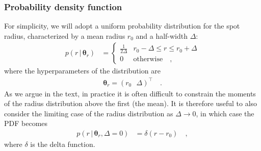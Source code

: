 \documentclass[modern]{aastex62}
\begin{document}
\subsubsection{Probability density function}
%
For simplicity, we will adopt a uniform probability distribution for the
spot radius, characterized by a mean radius $r_0$ and a half-width $\Delta$:
%
\begin{align}
    p(r \, \big| \, \pmb{\theta}_{r})
     & =
    \begin{cases}
        \frac{1}{2\Delta} & r_0 - \Delta \leq r \leq r_0 + \Delta
        \\
        0                 & \mathrm{otherwise}
        \quad,
    \end{cases}
\end{align}
%
where the hyperparameters of the distribution are
%
\begin{align}
    \pmb{\theta}_r = \left(
    r_0 \, \, \, \,
    \Delta \right)^\top
    \quad.
\end{align}
%
As we argue in the text, in practice it is often difficult to constrain the
moments of the radius distribution above the first (the mean). It is
therefore useful to also consider the limiting case of the radius distribution
as $\Delta \rightarrow 0$, in which case the PDF becomes
%
\begin{align}
    p(r \, \big| \, \pmb{\theta}_{r}, \Delta = 0)
     & =
    \delta(r - r_0)
    \quad,
\end{align}
%
where $\delta$ is the delta function.
%
\end{document}
